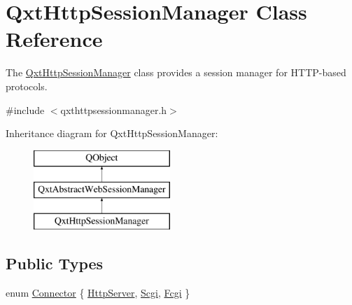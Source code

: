 \hypertarget{class_qxt_http_session_manager}{\section{Qxt\-Http\-Session\-Manager Class Reference}
\label{class_qxt_http_session_manager}
}


The \hyperlink{class_qxt_http_session_manager}{Qxt\-Http\-Session\-Manager} class provides a session manager for H\-T\-T\-P-\/based protocols.  




{\ttfamily \#include $<$qxthttpsessionmanager.\-h$>$}

Inheritance diagram for Qxt\-Http\-Session\-Manager\-:\begin{figure}[H]
\begin{center}
\leavevmode
\includegraphics[height=3.000000cm]{class_qxt_http_session_manager}
\end{center}
\end{figure}
\subsection*{Public Types}
\begin{DoxyCompactItemize}
\item 
enum \hyperlink{class_qxt_http_session_manager_ab2d71d18915557dfea9d009f7af4f9ca}{Connector} \{ \hyperlink{class_qxt_http_session_manager_ab2d71d18915557dfea9d009f7af4f9caa267ac7f6101025fecd24680dd7906d36}{Http\-Server}, 
\hyperlink{class_qxt_http_session_manager_ab2d71d18915557dfea9d009f7af4f9caa924c171201daa1f8020d166e82273120}{Scgi}, 
\hyperlink{class_qxt_http_session_manager_ab2d71d18915557dfea9d009f7af4f9caa708933f0a42526dfd5d8cd6a788741bc}{Fcgi}
 \}
\end{DoxyCompactItemize}
